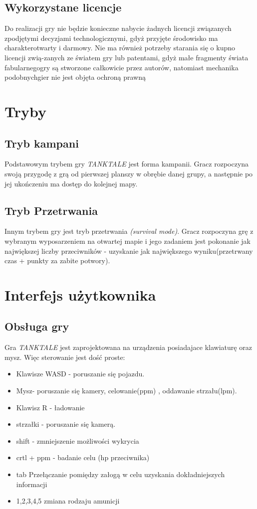 \documentclass{article}
\begin{document}
\subsection{Wykorzystane licencje}
Do  realizacji  gry  nie  będzie  konieczne  nabycie  żadnych  licencji  związanych  zpodjętymi decyzjami technologicznymi, gdyż przyjęte środowisko ma charakterotwarty i darmowy. Nie ma również potrzeby starania się o kupno licencji zwią-zanych ze światem gry lub patentami, gdyż małe fragmenty świata fabularnegogry  są  stworzone  całkowicie  przez  autorów,  natomiast  mechanika  podobnychgier nie jest objęta ochroną prawną
\newpage

\section{Tryby}
    \subsection{Tryb kampani}
Podstawowym trybem gry \emph{TANKTALE} jest forma kampanii. Gracz rozpoczyna swoją przygodę z grą od pierwszej planszy w obrębie danej grupy, a następnie po jej ukończeniu ma dostęp do kolejnej mapy.
    \subsection{Tryb Przetrwania}
Innym trybem gry jest tryb przetrwania \emph{(survival mode)}. Gracz rozpoczyna grę z wybranym wyposarzeniem na otwartej mapie i jego zadaniem jest pokonanie jak największej liczby przeciwników - uzyskanie jak największego wyniku(przetrwany czas + punkty za zabite potwory).
    \newpage
    
\section{Interfejs użytkownika}
    \subsection{Obsługa gry}
Gra \emph{TANKTALE} jest zaprojektowana na urządzenia posiadajace klawiaturę oraz mysz. Więc sterowanie jest dość proste:
\begin{itemize}
    \item Klawisze WASD - poruszanie się pojazdu.
    \item Mysz- poruszanie się kamery, celowanie(ppm) , oddawanie strzału(lpm).
    \item Klawisz R - ładowanie
    \item strzałki - poruszanie się kamerą.
    \item shift - zmniejszenie możliwości wykrycia
    \item crtl + ppm - badanie celu (hp przeciwnika)
    \item tab Przełączanie pomiędzy załogą w celu uzyskania dokładniejszych informacji
    \item 1,2,3,4,5 zmiana rodzaju amunicji
    
\end{itemize}
\end{document}
